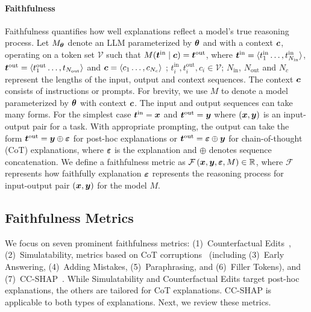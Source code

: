 \paragraph{Faithfulness} Faithfulness quantifies how well explanations reflect a model’s true reasoning process. Let $M_{{\bm{\theta}}}$ denote an LLM parameterized by ${\bm{\theta}}$ and with a context ${\bm{c}}$, operating on a token set $\mathcal{V}$ such that $M({\bm{t}}^{\text{in}} \mid {\bm{c}}) = {\bm{t}}^{\text{out}}$, where ${\bm{t}}^{\text{in}} = \langle t^{\text{in}}_1 \ldots, t^{\text{in}}_{N_{\text{in}}} \rangle$, ${\bm{t}}^{\text{out}} = \langle t^{\text{out}}_1 \ldots, t_{N_{\text{out}}} \rangle$ and ${\bm{c}} = \langle c_1 \ldots, c_{N_c} \rangle$ ; $t^{\text{in}}_i, t^{\text{out}}_i, c_i \in \mathcal{V}$; $N_{\text{in}}$,  $N_{\text{out}}$ and $N_c$ represent the lengths of the input, output and context sequences. The context ${\bm{c}}$ consists of instructions or prompts. For brevity, we use $M$ to denote a model parameterized by ${\bm{\theta}}$ with context ${\bm{c}}$. The input and output sequences can take many forms. For the simplest case ${\bm{t}}^{\text{in}} = {\bm{x}}$ and ${\bm{t}}^{\text{out}} = {\bm{y}}$ where $( {\bm{x}}, {\bm{y}})$ is an input-output pair for a task. With appropriate prompting, the output can take the form  ${\bm{t}}^{\text{out}} = {\bm{y}} \oplus {\ensuremath{\bm{\varepsilon}}} $  for post-hoc explanations or ${\bm{t}}^{\text{out}} = {\bm{\varepsilon}} \oplus {\bm{y}} $ for chain-of-thought (CoT) explanations, where ${\bm{\varepsilon}}$ is the explanation and $\oplus$ denotes sequence concatenation. We define a faithfulness metric as $\mathcal{F}\left({\bm{x}}, {\bm{y}}, {\bm{\varepsilon}}, M\right) \in \mathbb{R}$, where $\mathcal{F}$ represents how faithfully explanation ${\bm{\varepsilon}}$ represents the reasoning process for input-output pair $({\bm{x}},{\bm{y}})$ for the model $M$. %

\subsection{Faithfulness Metrics}

We focus on seven prominent faithfulness metrics: (1)~Counterfactual Edits~\citep{Atanasova2023FaithfulnessTF}, (2)~Simulatability, metrics based on CoT corruptions~\citep{Lanham2023MeasuringFI} (including (3)~Early Answering, (4)~Adding Mistakes, (5)~Paraphrasing, and (6)~Filler Tokens), and (7)~CC-SHAP~\citep{Parcalabescu2023OnMF}. While Simulatability and Counterfactual Edits target post-hoc explanations, the others are tailored for CoT explanations. CC-SHAP is applicable to both types of explanations. Next, we review these metrics.

